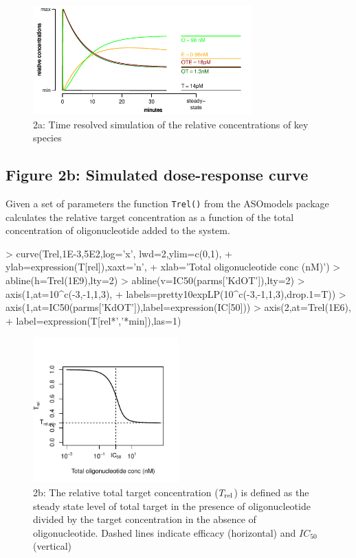 \documentclass{article}
\newenvironment{Ncenter}{%
  \setlength\topsep{-10pt}
  \setlength\parskip{-100pt}
  \begin{center}
}{%
  \end{center}
}
\newcommand{\Trel}{T_{\rm{rel}}}
\begin{document}
\begin{figure}[!h]
\begin{Ncenter}
\includegraphics[width=0.75\textwidth]{Vignette2-Fig1}
\end{Ncenter}
\caption{2a: Time resolved simulation of the relative concentrations of key species}
\end{figure}

\subsection*{Figure 2b: Simulated dose-response curve}
Given a set of parameters the function \texttt{Trel()} from the ASOmodels package calculates the relative target concentration as a function of the total concentration of oligonucleotide added to the system.
\begin{Schunk}
\begin{Sinput}
> curve(Trel,1E-3,5E2,log='x', lwd=2,ylim=c(0,1),
+       ylab=expression(T[rel]),xaxt='n',
+       xlab='Total oligonucleotide conc (nM)')
> abline(h=Trel(1E9),lty=2)
> abline(v=IC50(parms['KdOT']),lty=2)
> axis(1,at=10^c(-3,-1,1,3),
+      labels=pretty10expLP(10^c(-3,-1,1,3),drop.1=T))
> axis(1,at=IC50(parms['KdOT']),label=expression(IC[50]))
> axis(2,at=Trel(1E6),
+      label=expression(T[rel*','*min]),las=1)
\end{Sinput}
\end{Schunk}
\begin{figure}[!h]
\begin{Ncenter}
\includegraphics[width=0.5\textwidth]{Vignette2-Fig2}
\end{Ncenter}
\caption{2b: The relative total target concentration ($\Trel$) is defined as the steady state level of total target in the presence of oligonucleotide divided by the target concentration in the absence of oligonucleotide. Dashed lines indicate efficacy (horizontal) and $IC_{50}$ (vertical)}
\end{figure}
\end{document}
